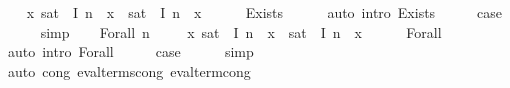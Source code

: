 \begin{isabellebody}
\ \ \isamarkupfalse%
\ {\isachardoublequoteopen}{\isasymAnd}x{\isachardot}{\kern0pt}\ sat\ {\isasymphi}\ I\ {\isacharparenleft}{\kern0pt}{\isasymsigma}{\isacharparenleft}{\kern0pt}n\ {\isacharcolon}{\kern0pt}{\isacharequal}{\kern0pt}\ x{\isacharparenright}{\kern0pt}{\isacharparenright}{\kern0pt}\ {\isacharequal}{\kern0pt}\ sat\ {\isasymphi}\ I\ {\isacharparenleft}{\kern0pt}{\isasymsigma}{\isacharprime}{\kern0pt}{\isacharparenleft}{\kern0pt}n\ {\isacharcolon}{\kern0pt}{\isacharequal}{\kern0pt}\ x{\isacharparenright}{\kern0pt}{\isacharparenright}{\kern0pt}{\isachardoublequoteclose}\isanewline
\ \ \ \ \isamarkupfalse%
\ Exists{\isacharparenleft}{\kern0pt}{}{\isacharparenright}{\kern0pt}\isanewline
\ \ \ \ \isamarkupfalse%
\ {\isacharparenleft}{\kern0pt}auto\ intro{\isacharbang}{\kern0pt}{\isacharcolon}{\kern0pt}\ Exists{\isacharparenleft}{\kern0pt}{}{\isacharparenright}{\kern0pt}{\isacharparenright}{\kern0pt}\isanewline
\ \ \isamarkupfalse%
\ \isamarkupfalse%
\ {\isacharquery}{\kern0pt}case\isanewline
\ \ \ \ \isamarkupfalse%
\ simp\isanewline
{}\isamarkupfalse%
\isanewline
\ \ \isamarkupfalse%
\ {\isacharparenleft}{\kern0pt}Forall\ n\ {\isasymphi}{\isacharparenright}{\kern0pt}\isanewline
\ \ \isamarkupfalse%
\ {\isachardoublequoteopen}{\isasymAnd}x{\isachardot}{\kern0pt}\ sat\ {\isasymphi}\ I\ {\isacharparenleft}{\kern0pt}{\isasymsigma}{\isacharparenleft}{\kern0pt}n\ {\isacharcolon}{\kern0pt}{\isacharequal}{\kern0pt}\ x{\isacharparenright}{\kern0pt}{\isacharparenright}{\kern0pt}\ {\isacharequal}{\kern0pt}\ sat\ {\isasymphi}\ I\ {\isacharparenleft}{\kern0pt}{\isasymsigma}{\isacharprime}{\kern0pt}{\isacharparenleft}{\kern0pt}n\ {\isacharcolon}{\kern0pt}{\isacharequal}{\kern0pt}\ x{\isacharparenright}{\kern0pt}{\isacharparenright}{\kern0pt}{\isachardoublequoteclose}\isanewline
\ \ \ \ \isamarkupfalse%
\ Forall{\isacharparenleft}{\kern0pt}{}{\isacharparenright}{\kern0pt}\isanewline
\ \ \ \ \isamarkupfalse%
\ {\isacharparenleft}{\kern0pt}auto\ intro{\isacharbang}{\kern0pt}{\isacharcolon}{\kern0pt}\ Forall{\isacharparenleft}{\kern0pt}{}{\isacharparenright}{\kern0pt}{\isacharparenright}{\kern0pt}\isanewline
\ \ \isamarkupfalse%
\ \isamarkupfalse%
\ {\isacharquery}{\kern0pt}case\isanewline
\ \ \ \ \isamarkupfalse%
\ simp\isanewline
{}\isamarkupfalse%
\ {\isacharparenleft}{\kern0pt}auto\ cong{\isacharcolon}{\kern0pt}\ eval{\isacharunderscore}{\kern0pt}terms{\isacharunderscore}{\kern0pt}cong\ eval{\isacharunderscore}{\kern0pt}term{\isacharunderscore}{\kern0pt}cong{\isacharparenright}{\kern0pt}%

\end{isabellebody}
